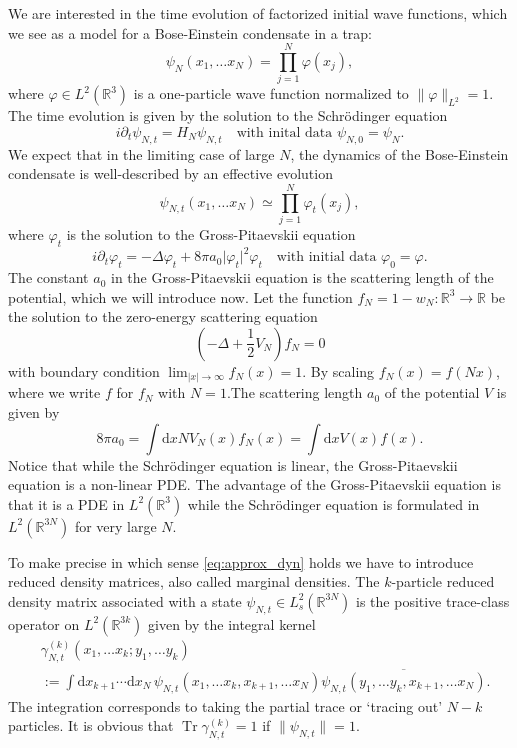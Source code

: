 \documentclass[11pt,a4paper,draft,DIV11]{scrartcl}	%
\newcommand{\di}{\textrm{d}}		%
\newcommand{\cc}[1]{\overline{#1}}	%
\newcommand{\Rbb}{\mathbb{R}}		%
\newcommand{\norm}[1]{\lVert#1\rVert}	%
\newcommand{\Tr}{\operatorname{Tr}}	%
\newcommand{\be}[1]{\begin{equation}\label{eq:#1}}	%
\newcommand{\ee}{\end{equation}}
\newcommand{\bd}{\begin{displaymath}}			%
\newcommand{\ed}{\end{displaymath}}
\newcommand{\eqr}[1]{\eqref{eq:#1}}			%
\begin{document}
We are interested in the time evolution of factorized initial wave functions, which we see as a model for a Bose-Einstein condensate in a trap:
\bd
\psi_N(x_1,\ldots x_N) = \prod_{j=1}^N \varphi(x_j),
\ed
where $\varphi \in L^2(\Rbb^3)$ is a one-particle wave function normalized to $\norm{\varphi}_{L^2} = 1$. The time evolution is given by the solution to the Schr\"odinger equation 
\bd
i \partial_t \psi_{N,t} = H_N \psi_{N,t}\quad \mbox{with inital data } \psi_{N,0} = \psi_N.
\ed
We expect that in the limiting case of large $N$, the dynamics of the
Bose-Einstein condensate is well-described by an effective evolution
\be{approx_dyn}
\psi_{N,t}(x_1,\ldots x_N) \simeq \prod_{j=1}^N \varphi_t(x_j),
\ee
where $\varphi_t$ is the solution to the Gross-Pitaevskii equation
\be{gp}
i \partial_t \varphi_t = - \Delta \varphi_t + 8\pi a_0 \lvert \varphi_t\rvert^2 \varphi_t\quad \mbox{with initial data } \varphi_0 = \varphi.
\ee
The constant $a_0$ in the Gross-Pitaevskii equation is the scattering length of the potential, which we will introduce now.
Let the function $f_N = 1 - w_N: \Rbb^3 \to \Rbb$ be the solution to the zero-energy scattering equation
\begin{equation}
\label{eq:scatt}
\left(-\Delta + \frac{1}{2}V_N \right) f_N = 0
\end{equation}
with boundary condition $\lim_{\lvert x\rvert \to \infty} f_N(x) = 1$. By scaling $f_N(x) = f(Nx)$, where we write $f$ for $f_N$ with $N=1$.The scattering length $a_0$ of the potential $V$ is given by
\bd
8\pi a_0 = \int \di x NV_N(x)f_N(x) = \int \di x V(x)f(x).
\ed
Notice that while the Schr\"odinger equation is linear, the Gross-Pitaevskii equation is a non-linear PDE. The advantage of the Gross-Pitaevskii equation is that it is a PDE in $L^2(\Rbb^3)$ while the Schr\"odinger equation is formulated in $L^2(\Rbb^{3N})$ for very large $N$.

To make precise in which sense \eqr{approx_dyn} holds we have to introduce reduced density matrices, also called marginal densities.
The $k$-particle reduced density matrix associated with a state $\psi_{N,t} \in L^2_s(\Rbb^{3N})$ is the positive trace-class operator on $L^2(\Rbb^{3k})$ given by the integral kernel
\be{red_density}
\begin{split}
& \gamma_{N,t}^{(k)}(x_1,\ldots x_k;y_1,\ldots y_k) \\
&  := \int \di x_{k+1} \cdots \di x_N\,\psi_{N,t}(x_1,\ldots x_k,x_{k+1},\ldots x_N) \cc{\psi_{N,t}(y_1,\ldots y_k,x_{k+1},\ldots x_N)}.
\end{split}
\ee
The integration corresponds to taking the partial trace or `tracing out' $N-k$ particles. It is obvious that $\Tr \gamma_{N,t}^{(k)} = 1$ if $\norm{\psi_{N,t}} = 1$.
\end{document}
